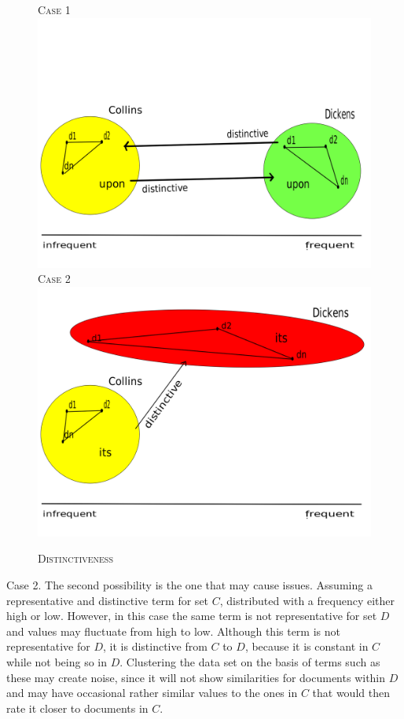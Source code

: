 \documentclass[a4paper,10pt,twoside,fleqn]{article}
\begin{document}
\begin{figure}
\caption{\textsc{Distinctiveness}}
{\scriptsize \textsc{Case 1}}\\
  \includegraphics[scale=0.2,width=\linewidth]{figures/distinc1-fin.png}
{\scriptsize \textsc{Case 2}}\\
  \includegraphics[scale=0.2,width=\linewidth]{figures/distinc2-fin.png}
\end{figure}


Case 2. The second possibility is the one that may cause issues.
Assuming a representative and distinctive term for set $C$, distributed with a 
frequency either high or low. 
However, in this case the same term is not representative for set $D$ and values 
may fluctuate from high to low. Although this term is not representative 
for $D$, it is distinctive from $C$ to $D$, because it is constant in $C$ 
while not being so in $D$. 
Clustering the data set on the basis of terms such as these may create noise, 
since it will not show similarities for documents within $D$ and 
may have occasional rather similar values to the ones in $C$ that would
then rate it closer to documents in $C$.
\end{document}
